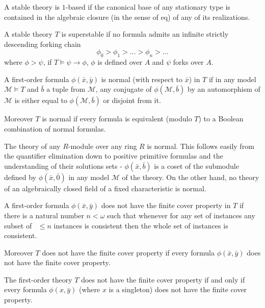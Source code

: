 \documentclass[a4paper,11pt]{article}
\begin{document}
\begin{definition}
A stable theory is $1$-based if the canonical base of any stationary type is contained in the algebraic closure (in the sense of eq) of any of its realizations. 
\end{definition}



\begin{definition}[Superstability]
A stable theory $T$ is superstable if no formula admits an infinite strictly descending forking chain $$\phi_0>\phi_1>\ldots>\phi_n>\ldots$$
where $\phi>\psi$, if $T\models \psi\rightarrow\phi$, $\phi$ is defined over $A$ and $\psi$ forks over $A$.
\end{definition}

\begin{definition}[Normality]
A first-order formula $\phi(\bar x, \bar y)$ is normal (with respect to $\bar x$) in $T$ if in any model $\mathcal{M}\models T$ and $\bar b$ a tuple from $\mathcal{M}$, any conjugate of $\phi(\mathcal{M}, \bar b)$ by an automorphism of $\mathcal{M}$ is either equal to $\phi(\mathcal{M}, \bar b)$ or disjoint from it. 

Moreover $T$ is normal if every formula is equivalent (modulo $T$) to a Boolean combination of normal formulas.
\end{definition}

The theory of any $R$-module over any ring $R$ is normal. This follows easily from the quantifier elimination down to positive primitive formulas and the understanding of their solutions sets - $\phi(\bar x, \bar b)$ is a coset of the submodule defined by $\phi(\bar x, \bar 0)$ in any model $\mathcal{M}$ of the theory. On the other hand, no theory of an algebraically closed field of a fixed characteristic is normal. 

\begin{definition}
A first-order formula $\phi(\bar x, \bar y)$ does not have the finite cover property in $T$ if there is a natural number $n<\omega$ such that whenever for any set of instances any subset of \ $\leq n$ instances is consistent then the whole set of instances is consistent.  

Moreover $T$ does not have the finite cover property if every formula $\phi(\bar x, \bar y)$ does not have the finite cover property.
\end{definition}

\begin{fact}
The first-order theory $T$ does not have the finite cover property if and only if every formula $\phi(x,\bar y)$ (where $x$ is a singleton) does not have the finite cover property.
\end{fact}
\end{document}
